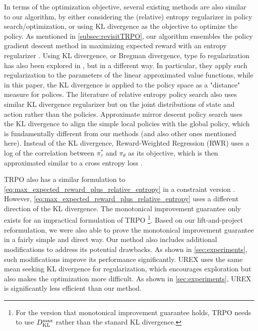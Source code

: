 In terms of the optimization objective, several existing methods are also similar to our algorithm,
by either considering the (relative) entropy regularizer in policy search/optimization, or using KL divergence as the objective to optimize the policy. 
As mentioned in \cref{subsec:revisitTRPO}, our algorithm ensembles
the policy gradient descent method in maximizing expected reward with an entropy regularizer \citep{williams1991function,fox2015taming,nachum2017bridging}.
Using KL divergence, or Bregman divergence, type fo regularization has also been explored  in \citet{liu2015finite,thomas2013projected,mahadevan2012sparse}, but in a different way. 
In particular, they apply such regularization to the parameters of the  linear approximated value functions, while in this paper, the KL divergence is applied to the policy space as a "distance" measure for polices. 
The literature of relative entropy policy search also uses similar KL divergence regularizer \citep{peters2010relative,van2015learning} but on the joint distributions of state and action rather than the policies. 
Approximate mirror descent policy search \citep{montgomery2016guided} uses the KL divergence to align the simple local policies with the global policy, which is fundamentally different from our methods (and also other ones mentioned here).
Instead of the KL divergence, Reward-Weighted Regression (RWR) uses a log of the correlation between $\pi^*_\tau$ and $\pi_\theta$ as its objective, which is then approximated similar to a cross entropy loss \citep{peters2007reinforcement,wierstra2008episodic}.

TRPO also has a similar formulation to \cref{eq:max_expected_reward_plus_relative_entropy} in a constraint version \citep{schulman2015trust}. 
However, \cref{eq:max_expected_reward_plus_relative_entropy} uses a different direction of the KL divergence. 
The monotonical improvement guarantee
only exists for an impractical formulation of TRPO \footnote{For the version that monotonical improvement guarantee holds, TRPO needs to use $D_{\mathrm{KL}}^{\max} $ rather than the stanard KL divergence.}. 
Based on our lift-and-project reformulation, we were also able to prove the monotonical improvement guarantee in a fairly simple and direct way.
Our method also includes additional modifications to address its potential drawbacks. As shown in \ref{sec:experiments}, such modifications improve its performance significantly.
UREX uses the same mean seeking KL divergence for regularization, which encourages exploration but also makes the optimization more difficult. As shown in \ref{sec:experiments}, UREX is significantly less efficient than our method. 

